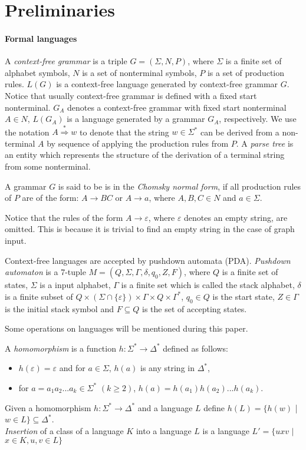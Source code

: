 \section{Preliminaries}
\label{sec:prel}
\label{preliminaries}
\paragraph{Formal languages} 
A \textit{context-free grammar} is a triple $G = (\Sigma, N, P)$, where $\Sigma$ is a finite set of alphabet symbols,  $N$ is a set of nonterminal symbols, $P$ is a set of production rules. $L(G)$ is a context-free language generated by context-free grammar $G$. Notice that usually context-free grammar is defined with a fixed start nonterminal. $G_A$ denotes a context-free grammar with fixed start nonterminal $A  \in N$, $L(G_A)$ is a language generated by a grammar $G_A$, respectively. We use the notation $A \stackrel {*}{\Rightarrow } w$  to denote that the string $w \in \Sigma^*$ can be derived from a non-terminal $A$ by sequence of applying the production rules from $P$. A \textit{parse tree} is an entity which represents the structure of the derivation of a terminal string from some nonterminal.


A grammar $G$ is said to be is in the \textit{Chomsky normal form}, if all production rules of $P$ are of the form:
$A \rightarrow BC$ or $A \rightarrow a$, where $A, B, C \in N$ and $a \in \Sigma$.


Notice that the rules of the form $A \rightarrow \varepsilon$, where $\varepsilon$ denotes an empty string, are omitted. This is because it is trivial to find an empty string in the case of graph input. 


Context-free languages are accepted by pushdown automata (PDA). \textit{Pushdown automaton} is a 7-tuple $M = (Q, \Sigma, \Gamma, \delta, q_0, Z, F)$, where $Q$ is a finite set of states, $\Sigma$ is a input alphabet, $\Gamma$ is a finite set which is called the stack alphabet, $\delta$ is a finite subset of $Q \times (\Sigma \cap \{\varepsilon\}) \times \Gamma \times Q \times \Gamma^*$,
$q_{0}\in Q$ is the start state, $Z \in \Gamma$ is the initial stack symbol and
$F\subseteq Q$ is the set of accepting states.


Some operations on languages will be mentioned during this paper.


A \textit{homomorphism} is a function $h: \Sigma^* \rightarrow \Delta^*$ defined as follows: 
\begin{itemize}
\item $h(\varepsilon) = \varepsilon$ and for $a \in \Sigma$, $h(a)$ is any string in $\Delta^*$,
\item for $a = a_1a_2 ... a_k \in \Sigma^*$ $(k \ge 2)$, $h(a) = h(a_1)h(a_2)... h(a_k)$.
\end{itemize}
Given a homomorphism $h: \Sigma^* \rightarrow \Delta^*$ and a language $L$ define $h(L)= \{h(w)$ | $w \in L\} \subseteq \Delta^*$.
\\
\textit{Insertion} of a class of a language $K$ into a language $L$ is a language $L' = \{uxv$ $|$ $x \in K, u, v \in L\}$ 


